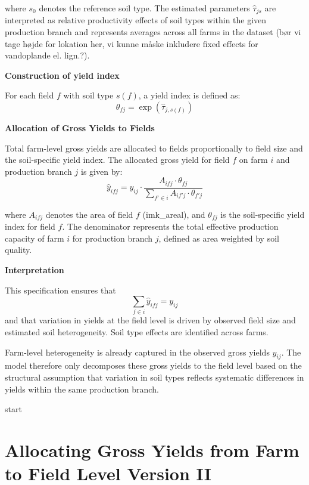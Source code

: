 \documentclass{article}
\begin{document}
where $s_0$ denotes the reference soil type. The estimated parameters $\hat{\tau}_{js}$ are interpreted as relative productivity effects of soil types within the given production branch and represents averages across all farms in the dataset (bør vi tage højde for lokation her, vi kunne måske inkludere fixed effects for vandoplande el. lign.?).

\vspace{0.5cm}

\textbf{Construction of yield index}

For each field $f$ with soil type $s(f)$, a yield index is defined as:
\[
\theta_{fj} = \exp\left( \hat{\tau}_{j, s(f)} \right)
\]

\vspace{0.5cm}

\textbf{Allocation of Gross Yields to Fields}

Total farm-level gross yields are allocated to fields proportionally to field size and the soil-specific yield index. The allocated gross yield for field $f$ on farm $i$ and production branch $j$ is given by:
\[
\hat{y}_{ifj}
=
y_{ij}
\cdot
\frac{A_{ifj} \cdot \theta_{fj}}
{\sum_{f' \in i} A_{if'j} \cdot \theta_{f'j}}
\]

where $A_{ifj}$ denotes the area of field $f$ (imk\_areal), and $\theta_{fj}$ is the soil-specific yield index for field $f$. The denominator represents the total effective production capacity of farm $i$ for production branch $j$, defined as area weighted by soil quality.

\vspace{0.5cm}

\textbf{Interpretation}

This specification ensures that 
\[
\sum_{f \in i} \hat{y}_{ifj} = y_{ij}
\]
and that variation in yields at the field level is driven by observed field size and estimated soil heterogeneity. Soil type effects are identified across farms.

Farm-level heterogeneity is already captured in the observed gross yields $y_{ij}$. The model therefore only decomposes these gross yields to the field level based on the structural assumption that variation in soil types reflects systematic differences in yields within the same production branch. 


start










\section{Allocating Gross Yields from Farm to Field Level Version II} 
\end{document}
